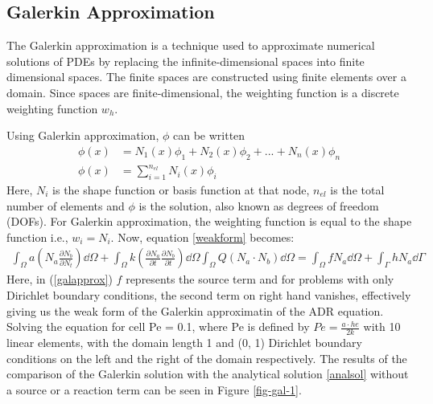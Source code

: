 \documentclass[12pt, oneside]{article}
\begin{document}
\subsection{Galerkin Approximation}
The Galerkin approximation is a technique used to approximate numerical solutions of PDEs by replacing the infinite-dimensional spaces into finite dimensional spaces. The finite spaces are constructed using finite elements over a domain. Since spaces are finite-dimensional, the weighting function is a discrete weighting function $w_h$.

Using Galerkin approximation, $\phi$ can be written
\begin{equation}
    \begin{aligned}
	\phi(x) &= N_1(x)\phi_1 + N_2(x)\phi_2 + ... + N_n(x)\phi_n\\
	\phi \left(x\right) &= \sum_{i=1}^{n_{el}} N_i \left(x\right) \phi_i	
    \end{aligned}
\end{equation}
Here, $N_i$ is the shape function or basis function at that node, $n_{el}$ is the total number of elements and $\phi$ is the solution, also known as degrees of freedom (DOFs). For Galerkin approximation, the weighting function is equal to the shape function i.e., $w_i = N_i$. Now, equation \ref{weakform} becomes:
\begin{equation} \label{galapprox}
    \begin{aligned}
	\int_\Omega a \left( N_a \frac{\partial N_b}{\partial N_t} \right) \dd \Omega + \int_\Omega k \left( \frac{\partial N_a}{\partial t} \frac{\partial N_b}{\partial t} \right) \dd \Omega \int_\Omega Q \left( N_a \cdot N_b \right) \dd \Omega = \int_\Omega f N_a \dd \Omega + \int_\Gamma h N_a \dd \Gamma
    \end{aligned}
\end{equation}
Here, in (\ref{galapprox}) $f$ represents the source term and for problems with only Dirichlet boundary conditions, the second term on right hand vanishes, effectively giving us the weak form of the Galerkin approximatin of the ADR equation. \\
Solving the equation for cell Pe = 0.1, where Pe is defined by $ Pe = \frac{a \cdot he}{2k}$ with 10 linear elements, with the domain length 1 and (0, 1) Dirichlet boundary conditions on the left and the right of the domain respectively. The results of the comparison of the Galerkin solution with the analytical solution \ref{analsol} without a source or a reaction term can be seen in Figure \ref{fig-gal-1}.\\
\end{document}
